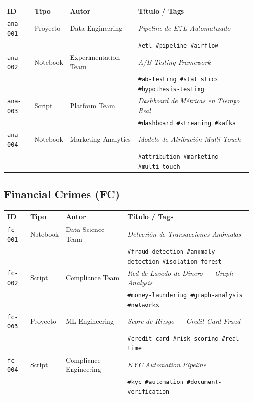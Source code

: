 \documentclass[12pt, a4paper]{article}
\begin{document}
\begin{longtable}{lllp{5.5cm}}
\toprule
\textbf{ID} & \textbf{Tipo} & \textbf{Autor} & \textbf{Título / Tags} \\
\midrule
\endhead
\texttt{ana-001} & Proyecto  & Data Engineering       & \textit{Pipeline de ETL Automatizado}\\
                 &           &                        & \texttt{\#etl \#pipeline \#airflow} \\[6pt]
\texttt{ana-002} & Notebook  & Experimentation Team   & \textit{A/B Testing Framework}\\
                 &           &                        & \texttt{\#ab-testing \#statistics \#hypothesis-testing} \\[6pt]
\texttt{ana-003} & Script    & Platform Team          & \textit{Dashboard de Métricas en Tiempo Real}\\
                 &           &                        & \texttt{\#dashboard \#streaming \#kafka} \\[6pt]
\texttt{ana-004} & Notebook  & Marketing Analytics    & \textit{Modelo de Atribución Multi-Touch}\\
                 &           &                        & \texttt{\#attribution \#marketing \#multi-touch} \\
\bottomrule
\end{longtable}

\subsection{Financial Crimes (FC)}

\begin{longtable}{lllp{5.5cm}}
\toprule
\textbf{ID} & \textbf{Tipo} & \textbf{Autor} & \textbf{Título / Tags} \\
\midrule
\endhead
\texttt{fc-001} & Notebook  & Data Science Team         & \textit{Detección de Transacciones Anómalas}\\
                &           &                           & \texttt{\#fraud-detection \#anomaly-detection \#isolation-forest} \\[6pt]
\texttt{fc-002} & Script    & Compliance Team           & \textit{Red de Lavado de Dinero --- Graph Analysis}\\
                &           &                           & \texttt{\#money-laundering \#graph-analysis \#networkx} \\[6pt]
\texttt{fc-003} & Proyecto  & ML Engineering            & \textit{Score de Riesgo --- Credit Card Fraud}\\
                &           &                           & \texttt{\#credit-card \#risk-scoring \#real-time} \\[6pt]
\texttt{fc-004} & Script    & Compliance Engineering    & \textit{KYC Automation Pipeline}\\
                &           &                           & \texttt{\#kyc \#automation \#document-verification} \\
\bottomrule
\end{longtable}
\end{document}
